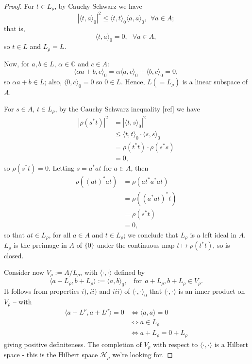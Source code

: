 \documentclass[12pt,a4paper]{amsart}
\theoremstyle{plain}
\theoremstyle{definition}
\newcommand{\Hr}{\mathcal{H}_\rho}
\newcommand{\1}{\mathbbm{1}}
\begin{document}
\begin{proof}
	For $t \in L_\rho$, by Cauchy-Schwarz we have 
	\[ 
		|\langle t,a \rangle_0|^2 \leq \langle t,t \rangle_0 \langle a,a\rangle_0,~~ \forall a \in A;
	\]
	that is,
	\[
		\langle t,a \rangle _0 = 0, ~~~ \forall a \in A,
	\]
	so $t\in L$ and $L_\rho =L$.
	
	Now, for $a,b \in L$, $\alpha \in \mathbb{C}$ and $c \in A$:
	\[
		\langle \alpha a + b, c \rangle _0 = \alpha \langle a,c \rangle _0 + \langle b,c\rangle _0 = 0,
	\]
	so $\alpha a +b \in L$; also, $\langle 0,c\rangle _0 = 0$ so $0 \in L$. 
	Hence, $L ( =L_\rho ) $ is a linear subspace of $A$.
	
	For $s \in A$, $t\in L_\rho$, by the Cauchy Schwarz inequality [ref] we have 
	\begin{align*}
		|\rho (s^\ast t) |^2 
		&= 		|\langle t,s\rangle_0 |^2 									\\
		&\leq 	\langle t,t\rangle_0 \cdot \langle s,s\rangle_0  			\\
		&= 		\rho (t^\ast t) \cdot \rho (s^\ast s)						\\
		&=		0,
	\end{align*}
	so $\rho (s^\ast t) = 0$. Letting $s = a^\ast a t$ for $a \in A$, then
	\begin{align*}
		\rho ((at)^\ast at) 
		&= 		\rho (at^\ast a^\ast at) 									\\
		&= 		\rho ((a^\ast at)^\ast t) 									\\
		&= 		\rho (s^\ast t) 											\\
		&=		0,
	\end{align*}
	so that $at \in L_\rho$, for all $a \in A$ and $t \in L_\rho$; 
	we conclude that $L_\rho$ is a left ideal in $A$.
	$L_\rho$ is  the preimage in $A$ of $\{0\}$ under the continuous map%
	$t \mapsto \rho (t^\ast t)$, so is closed.
	
	Consider now $V_\rho := A / L_\rho$, with $\langle \cdot,\cdot\rangle$ defined by 
	\[
		\langle a+L_\rho,b+L_\rho \rangle := \langle a,b\rangle_0, ~~~~ 
		\mbox{for}~~a+L_\rho,b+L_\rho \in V_\rho.
	\]
	It follows from properties $i),ii)$ and $iii)$ of $\langle \cdot,\cdot  \rangle _0$ that
	$\langle \cdot,\cdot  \rangle$ is an inner product on $V_\rho$ -- with
	\begin{align*}
				\langle a + L^\rho, a + L^\rho \rangle = 0
		&\iff 	\langle a,a\rangle=0										\\
		&\iff 	a \in L_\rho												\\
		&\iff 	a+L_\rho = 0+L_\rho
	\end{align*}
	giving positive definiteness.
	The completion of $V_\rho$ with respect to $\langle \cdot,\cdot  \rangle$ is a Hilbert space -
	this is the Hilbert space $\Hr$ we're looking for.
	

\end{proof}
\end{document}
